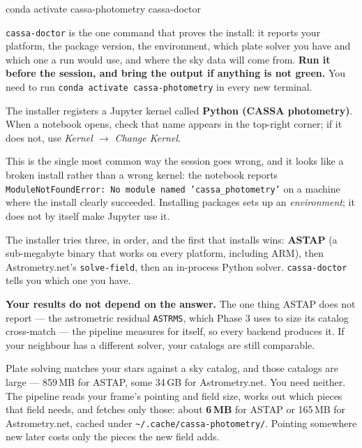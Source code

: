 \documentclass[11pt,a4paper]{article}
\newcommand{\cm}[1]{\texttt{\small #1}}
\begin{document}
\begin{cmd}
\begin{cmdtext}
conda activate cassa-photometry
cassa-doctor
\end{cmdtext}
\end{cmd}

\cm{cassa-doctor} is the one command that proves the install: it reports your
platform, the package version, the environment, which plate solver you have and
which one a run would use, and where the sky data will come from.
\textbf{Run it before the session, and bring the output if anything is not
green.} You need to run \cm{conda activate cassa-photometry} in every new
terminal.

\begin{note}
The installer registers a Jupyter kernel called \textbf{Python (CASSA
photometry)}. When a notebook opens, check that name appears in the top-right
corner; if it does not, use \emph{Kernel $\rightarrow$ Change Kernel}.

This is the single most common way the session goes wrong, and it looks like a
broken install rather than a wrong kernel: the notebook reports
\cm{ModuleNotFoundError: No module named 'cassa\_photometry'} on a machine where
the install clearly succeeded. Installing packages sets up an \emph{environment};
it does not by itself make Jupyter use it.
\end{note}

\begin{note}
The installer tries three, in order, and the first that installs wins:
\textbf{ASTAP} (a sub-megabyte binary that works on every platform, including
ARM), then Astrometry.net's \cm{solve-field}, then an in-process Python solver.
\cm{cassa-doctor} tells you which one you have.

\textbf{Your results do not depend on the answer.} The one thing ASTAP does not
report --- the astrometric residual \cm{ASTRMS}, which Phase 3 uses to size its
catalog cross-match --- the pipeline measures for itself, so every backend
produces it. If your neighbour has a different solver, your catalogs are still
comparable.
\end{note}

\begin{note}
Plate solving matches your stars against a sky catalog, and those catalogs are
large --- 859\,MB for ASTAP, some 34\,GB for Astrometry.net. You need neither.
The pipeline reads your frame's pointing and field size, works out which pieces
that field needs, and fetches only those: about \textbf{6\,MB} for ASTAP or
165\,MB for Astrometry.net, cached under \cm{\textasciitilde/.cache/cassa-photometry/}.
Pointing somewhere new later costs only the pieces the new field adds.
\end{note}
\end{document}

